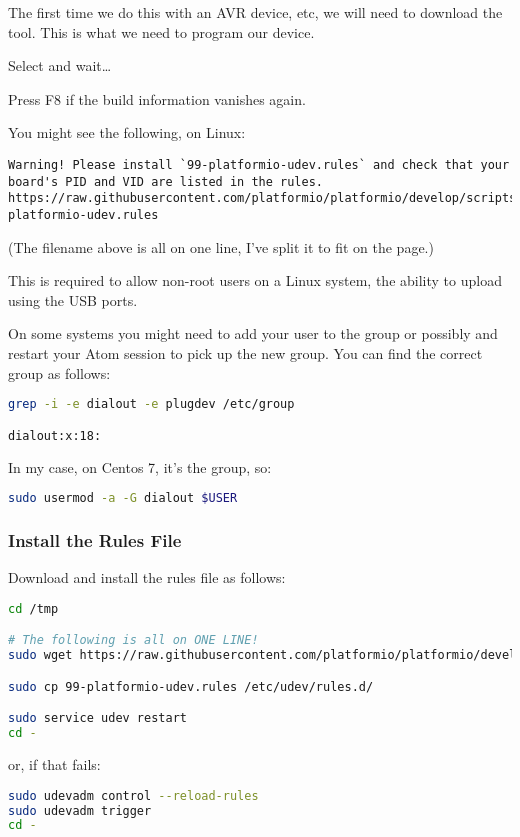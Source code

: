 The first time we do this with an AVR device,   etc, we will need to download the  tool. This is what we need to program our device.

Select  and wait\ldots{}

Press F8 if the build information vanishes again.

You might see the following, on Linux:

\begin{lstlisting}
Warning! Please install `99-platformio-udev.rules` and check that your board's PID and VID are listed in the rules.
https://raw.githubusercontent.com/platformio/platformio/develop/scripts/99-platformio-udev.rules
\end{lstlisting}

(The filename above is all on one line, I've split it to fit on the page.)

This is required to allow non-root users on a Linux system, the ability
to upload using the USB ports. 

On some systems you might need to add your 
user to the group  or possibly  and 
restart your Atom session to pick up the new group. You can find the correct group
as follows:

\begin{lstlisting}[language=bash]
grep -i -e dialout -e plugdev /etc/group

dialout:x:18:
\end{lstlisting}

In my case, on Centos 7, it's the  group, so:

\begin{lstlisting}[language=bash]
sudo usermod -a -G dialout $USER
\end{lstlisting}


\subsubsection{Install the Rules File}\label{install-the-rules-file}

Download and install the rules file as follows:

\begin{lstlisting}[language=bash]
cd /tmp

# The following is all on ONE LINE!
sudo wget https://raw.githubusercontent.com/platformio/platformio/develop/scripts/99-platformio-udev.rules

sudo cp 99-platformio-udev.rules /etc/udev/rules.d/

sudo service udev restart
cd -
\end{lstlisting}

or, if that fails:

\begin{lstlisting}[language=bash]
sudo udevadm control --reload-rules
sudo udevadm trigger
cd -
\end{lstlisting}


